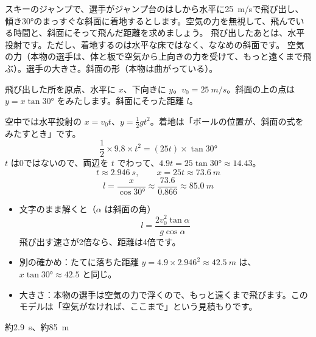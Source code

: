 \begin{phreidai}[ジャンプ台から飛び出す]
\label{ph:力-1:ex13}スキーのジャンプで、選手がジャンプ台のはしから水平に\qty{25}{m/s}で飛び出し、傾き30°のまっすぐな斜面に着地するとします。空気の力を無視して、飛んでいる時間と、斜面にそって飛んだ距離を求めましょう。
\phbamen
飛び出したあとは、水平投射です。ただし、着地するのは水平な床ではなく、ななめの斜面です。
\phmushi
空気の力（本物の選手は、体と板で空気から上向きの力を受けて、もっと遠くまで飛ぶ）。選手の大きさ。斜面の形（本物は曲がっている）。
\phzu
\noindent\begin{minipage}[c]{0.5\linewidth}\centering
{}
\end{minipage}\hfill
\begin{minipage}[c]{0.47\linewidth}
飛び出した所を原点、水平に $x$、下向きに $y$。$v_0=\qty{25}{m/s}$。斜面の上の点は $y=x\tan30°$ をみたします。斜面にそった距離 $l$。
\end{minipage}
\phriyu
空中では水平投射の $x=v_0t$、$y=\tfrac{1}{2}gt^2$。着地は「ボールの位置が、斜面の式をみたすとき」です。
\phtateru
\[ \frac{1}{2}\times9.8\times t^2=(25t)\times\tan30° \]
\phtoku
$t$ は0ではないので、両辺を $t$ でわって、$4.9t=25\tan30°\approx14.43$。
\[ t\approx\qty{2.946}{s},\qquad x=25t\approx\qty{73.6}{m} \]
\[ l=\frac{x}{\cos30°}\approx\frac{73.6}{0.866}\approx\qty{85.0}{m} \]
\phtashikame
\begin{itemize}[leftmargin=1.2\zw, itemsep=1pt, topsep=1pt, label={\color{bkTheme}●}]
\item 文字のまま解くと（$\alpha$ は斜面の角）
\[ l=\frac{2v_0^2\tan\alpha}{g\cos\alpha} \]
飛び出す速さが2倍なら、距離は4倍です。
\item 別の確かめ：たてに落ちた距離 $y=4.9\times2.946^2\approx\qty{42.5}{m}$ は、$x\tan30°\approx42.5$ と同じ。
\item 大きさ：本物の選手は空気の力で浮くので、もっと遠くまで飛びます。このモデルは「空気がなければ、ここまで」という見積もりです。
\end{itemize}
\kotae 約\qty{2.9}{s}、約\qty{85}{m}
\end{phreidai}
